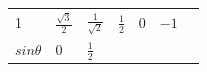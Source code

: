 {{\begin{center}
\begin{xtabular}[t]{|l|l|l|l|l|l|l|}
        1 &
                \begin{math}\frac{\sqrt{3}}{2}\end{math}
               &
                \begin{math}\frac{1}{\sqrt{2}}\end{math}
               &
                \begin{math}\frac{1}{2}\end{math}
               &
        0 &
                \begin{math}-1\end{math}
     \tabularnewline{}
                \begin{math}sin\theta \end{math}
               &
        0 &
                \begin{math}\frac{1}{2}\end{math}
               &

\end{xtabular}
\end{center}}}
